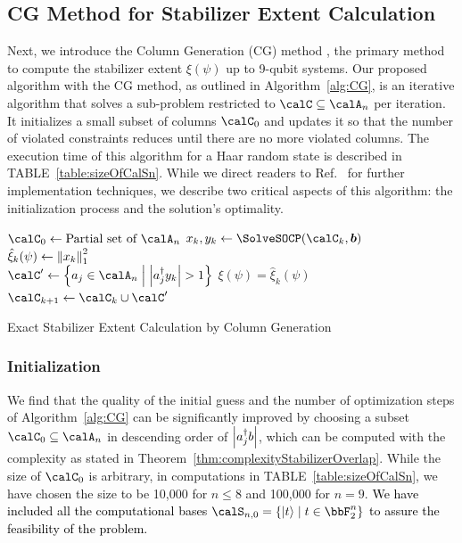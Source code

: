 \documentclass[aps,prx,onecolumn,superscriptaddress,nobibnotes,nofootinbib]{revtex4-2}
\newcommand{\black}[1]{\textcolor{black}{#1}}
\newcommand{\relmiddle}[1]{\mathrel{}\middle#1\mathrel{}}
\begin{document}
\subsection{CG Method for Stabilizer Extent Calculation}
\label{subsec:CG}

Next, we introduce the Column Generation (CG) method \cite{desaulniersColumnGeneration2005}, the primary method to compute the stabilizer extent $\xi(\psi)$ up to 9-qubit systems.
Our proposed algorithm with the CG method, as outlined in Algorithm~\ref{alg:CG}, is an iterative algorithm that solves a sub-problem restricted to $\calC \subseteq \calA_n$ per iteration.
It initializes a small subset of columns $\calC_0$ and updates it so that the number of violated constraints reduces until there are no more violated columns.
The execution time of this algorithm for a Haar random state is described in TABLE~\ref{table:sizeOfCalSn}.
While we direct readers to Ref.~\cite{Hamaguchi2024handbookquantifying} for further implementation techniques, we describe two critical aspects of this algorithm: the initialization process and the solution's optimality.

\begin{algorithm}[htbp]
  $\calC_0 \gets \text{Partial set of $\calA_n$}$
   {
    $x_k, y_k \gets \SolveSOCP(\calC_k, \bm{b})$\\
    $\hat{\xi}_k(\psi) \gets \norm{x_k}_1^2$\\
    $\calC' \gets \qty{a_j \in \calA_n \relmiddle| \abs{a_j^\dagger y_k} > 1}$
     {
      \Return $\xi(\psi) = \hat{\xi}_k(\psi)$
    }
    $\calC_{k+1} \gets \calC_{k} \cup \calC'$
  }
  \caption{Exact Stabilizer Extent Calculation by Column Generation}
  \label{alg:CG}
\end{algorithm}

\subsubsection{Initialization}
\label{subsec:initialization}

We find that the quality of the initial guess and the number of optimization steps of Algorithm~\ref{alg:CG} can be significantly improved by choosing a subset $\calC_0 \subseteq \calA_n$ in descending order of $\abs{a_j^\dagger b}$, which can be computed with the complexity as stated in Theorem~\ref{thm:complexityStabilizerOverlap}.
While the size of $\calC_0$ is arbitrary, in computations in TABLE~\ref{table:sizeOfCalSn}, we have chosen the size to be 10,000 for $n \leq 8$ and 100,000 for $n=9$. \black{We have included all the computational bases $\calS_{n,0} = \left\{ \ket{t} \relmiddle| t \in \bbF_2^{n} \right\}$ to assure the feasibility of the problem.}
\end{document}
